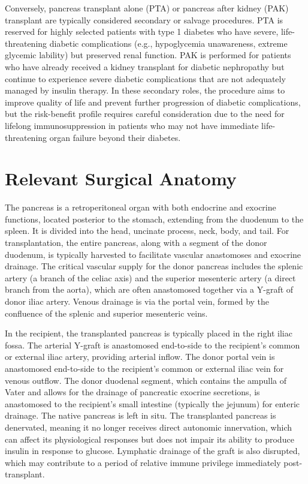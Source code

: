 Conversely, pancreas transplant alone (PTA) or pancreas after kidney (PAK) transplant are typically considered secondary or salvage procedures. PTA is reserved for highly selected patients with type 1 diabetes who have severe, life-threatening diabetic complications (e.g., hypoglycemia unawareness, extreme glycemic lability) but preserved renal function. PAK is performed for patients who have already received a kidney transplant for diabetic nephropathy but continue to experience severe diabetic complications that are not adequately managed by insulin therapy. In these secondary roles, the procedure aims to improve quality of life and prevent further progression of diabetic complications, but the risk-benefit profile requires careful consideration due to the need for lifelong immunosuppression in patients who may not have immediate life-threatening organ failure beyond their diabetes.

\section*{Relevant Surgical Anatomy}
The pancreas is a retroperitoneal organ with both endocrine and exocrine functions, located posterior to the stomach, extending from the duodenum to the spleen. It is divided into the head, uncinate process, neck, body, and tail. For transplantation, the entire pancreas, along with a segment of the donor duodenum, is typically harvested to facilitate vascular anastomoses and exocrine drainage. The critical vascular supply for the donor pancreas includes the splenic artery (a branch of the celiac axis) and the superior mesenteric artery (a direct branch from the aorta), which are often anastomosed together via a Y-graft of donor iliac artery. Venous drainage is via the portal vein, formed by the confluence of the splenic and superior mesenteric veins.

In the recipient, the transplanted pancreas is typically placed in the right iliac fossa. The arterial Y-graft is anastomosed end-to-side to the recipient's common or external iliac artery, providing arterial inflow. The donor portal vein is anastomosed end-to-side to the recipient's common or external iliac vein for venous outflow. The donor duodenal segment, which contains the ampulla of Vater and allows for the drainage of pancreatic exocrine secretions, is anastomosed to the recipient's small intestine (typically the jejunum) for enteric drainage. The native pancreas is left in situ. The transplanted pancreas is denervated, meaning it no longer receives direct autonomic innervation, which can affect its physiological responses but does not impair its ability to produce insulin in response to glucose. Lymphatic drainage of the graft is also disrupted, which may contribute to a period of relative immune privilege immediately post-transplant.


